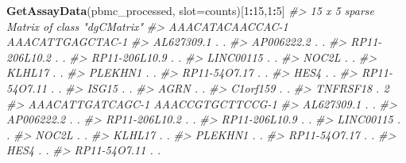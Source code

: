 \documentclass[
]{book}
\newenvironment{Shaded}{\begin{snugshade}}{\end{snugshade}}
\newcommand{\AttributeTok}[1]{\textcolor[rgb]{0.13,0.29,0.53}{#1}}
\newcommand{\CommentTok}[1]{\textcolor[rgb]{0.56,0.35,0.01}{\textit{#1}}}
\newcommand{\DecValTok}[1]{\textcolor[rgb]{0.00,0.00,0.81}{#1}}
\newcommand{\FunctionTok}[1]{\textcolor[rgb]{0.13,0.29,0.53}{\textbf{#1}}}
\newcommand{\NormalTok}[1]{#1}
\newcommand{\SpecialCharTok}[1]{\textcolor[rgb]{0.81,0.36,0.00}{\textbf{#1}}}
\newcommand{\StringTok}[1]{\textcolor[rgb]{0.31,0.60,0.02}{#1}}
\begin{document}
\begin{Shaded}
\begin{Highlighting}[]
\FunctionTok{GetAssayData}\NormalTok{(pbmc\_processed, }\AttributeTok{slot=}\StringTok{\textquotesingle{}counts\textquotesingle{}}\NormalTok{)[}\DecValTok{1}\SpecialCharTok{:}\DecValTok{15}\NormalTok{,}\DecValTok{1}\SpecialCharTok{:}\DecValTok{5}\NormalTok{]}
\CommentTok{\#\textgreater{} 15 x 5 sparse Matrix of class "dgCMatrix"}
\CommentTok{\#\textgreater{}               AAACATACAACCAC{-}1 AAACATTGAGCTAC{-}1}
\CommentTok{\#\textgreater{} AL627309.1                   .                .}
\CommentTok{\#\textgreater{} AP006222.2                   .                .}
\CommentTok{\#\textgreater{} RP11{-}206L10.2                .                .}
\CommentTok{\#\textgreater{} RP11{-}206L10.9                .                .}
\CommentTok{\#\textgreater{} LINC00115                    .                .}
\CommentTok{\#\textgreater{} NOC2L                        .                .}
\CommentTok{\#\textgreater{} KLHL17                       .                .}
\CommentTok{\#\textgreater{} PLEKHN1                      .                .}
\CommentTok{\#\textgreater{} RP11{-}54O7.17                 .                .}
\CommentTok{\#\textgreater{} HES4                         .                .}
\CommentTok{\#\textgreater{} RP11{-}54O7.11                 .                .}
\CommentTok{\#\textgreater{} ISG15                        .                .}
\CommentTok{\#\textgreater{} AGRN                         .                .}
\CommentTok{\#\textgreater{} C1orf159                     .                .}
\CommentTok{\#\textgreater{} TNFRSF18                     .                2}
\CommentTok{\#\textgreater{}               AAACATTGATCAGC{-}1 AAACCGTGCTTCCG{-}1}
\CommentTok{\#\textgreater{} AL627309.1                   .                .}
\CommentTok{\#\textgreater{} AP006222.2                   .                .}
\CommentTok{\#\textgreater{} RP11{-}206L10.2                .                .}
\CommentTok{\#\textgreater{} RP11{-}206L10.9                .                .}
\CommentTok{\#\textgreater{} LINC00115                    .                .}
\CommentTok{\#\textgreater{} NOC2L                        .                .}
\CommentTok{\#\textgreater{} KLHL17                       .                .}
\CommentTok{\#\textgreater{} PLEKHN1                      .                .}
\CommentTok{\#\textgreater{} RP11{-}54O7.17                 .                .}
\CommentTok{\#\textgreater{} HES4                         .                .}
\CommentTok{\#\textgreater{} RP11{-}54O7.11                 .                .}

\end{Highlighting}
\end{Shaded}
\end{document}
